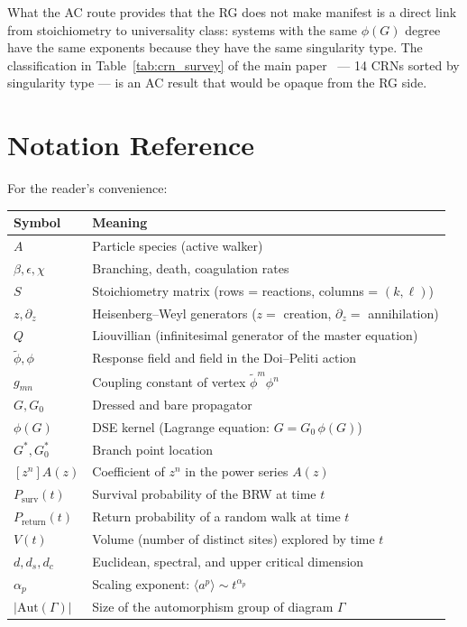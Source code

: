 \documentclass[11pt,a4paper]{article}
\theoremstyle{definition}
\newcommand{\phit}{\tilde{\phi}}
\newcommand{\Aut}{\mathrm{Aut}}
\newcommand{\Psurv}{P_{\mathrm{surv}}}
\newcommand{\Preturn}{P_{\mathrm{return}}}
\begin{document}
What the AC route provides that the RG does not make manifest
is a direct link from stoichiometry to universality class: systems
with the same $\phi(G)$ degree have the same exponents because they
have the same singularity type. The classification in
Table~\ref{tab:crn_survey} of the main paper~\cite{amarteifio2019}
--- 14 CRNs sorted by singularity type --- is an AC result that would
be opaque from the RG side.

\section{Notation Reference}
\label{app:notation}

For the reader's convenience:

\begin{center}
\renewcommand{\arraystretch}{1.3}
\begin{tabular}{lp{9cm}}
\toprule
\textbf{Symbol} & \textbf{Meaning} \\
\midrule
$A$ & Particle species (active walker) \\
$\beta, \epsilon, \chi$ & Branching, death, coagulation rates \\
$S$ & Stoichiometry matrix (rows = reactions, columns = $(k, \ell)$) \\
$z, \partial_z$ & Heisenberg--Weyl generators ($z = $ creation, $\partial_z = $ annihilation) \\
$Q$ & Liouvillian (infinitesimal generator of the master equation) \\
$\phit, \phi$ & Response field and field in the Doi--Peliti action \\
$g_{mn}$ & Coupling constant of vertex $\phit^m\phi^n$ \\
$G, G_0$ & Dressed and bare propagator \\
$\phi(G)$ & DSE kernel (Lagrange equation: $G = G_0\,\phi(G)$) \\
$G^*, G_0^*$ & Branch point location \\
$[z^n]A(z)$ & Coefficient of $z^n$ in the power series $A(z)$ \\
$\Psurv(t)$ & Survival probability of the BRW at time $t$ \\
$\Preturn(t)$ & Return probability of a random walk at time $t$ \\
$V(t)$ & Volume (number of distinct sites) explored by time $t$ \\
$d, d_s, d_c$ & Euclidean, spectral, and upper critical dimension \\
$\alpha_p$ & Scaling exponent: $\langle a^p \rangle \sim t^{\alpha_p}$ \\
$|\Aut(\Gamma)|$ & Size of the automorphism group of diagram $\Gamma$ \\
\bottomrule
\end{tabular}
\end{center}
\end{document}

